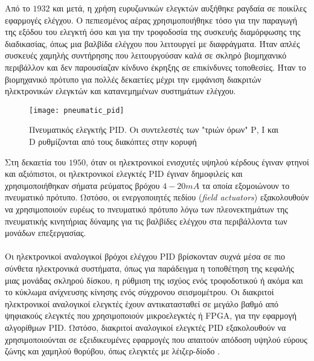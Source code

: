 Από το $1932$ και μετά, η χρήση ευρυζωνικών ελεγκτών αυξήθηκε ραγδαία σε ποικίλες εφαρμογές ελέγχου. Ο πεπιεσμένος αέρας χρησιμοποιήθηκε τόσο για την παραγωγή της εξόδου του ελεγκτή όσο και για την τροφοδοσία της συσκευής διαμόρφωσης της διαδικασίας, όπως μια βαλβίδα ελέγχου που λειτουργεί με διαφράγματα. Ήταν απλές συσκευές χαμηλής συντήρησης που λειτουργούσαν καλά σε σκληρό βιομηχανικό περιβάλλον και δεν παρουσίαζαν κίνδυνο έκρηξης σε επικίνδυνες τοποθεσίες. Ήταν το βιομηχανικό πρότυπο για πολλές δεκαετίες μέχρι την εμφάνιση διακριτών ηλεκτρονικών ελεγκτών και κατανεμημένων συστημάτων ελέγχου.

\begin{figure}[h]
  \centering
  \texttt{[image: pneumatic\_pid]}
  \caption{Πνευματικός ελεγκτής PID. Οι συντελεστές των "τριών όρων" Ρ, Ι και D ρυθμίζονται από τους διακόπτες στην κορυφή}
  \label{fig:pneumatic_pid}
\end{figure}

Στη δεκαετία του $1950$, όταν οι ηλεκτρονικοί ενισχυτές υψηλού κέρδους έγιναν φτηνοί και αξιόπιστοι, οι ηλεκτρονικοί ελεγκτές PID έγιναν δημοφιλείς και χρησιμοποιήθηκαν σήματα ρεύματος βρόχου $4-20 mA$ τα οποία εξομοιώνουν το πνευματικό πρότυπο. Ωστόσο, οι ενεργοποιητές πεδίου (\emph{field actuators}) εξακολουθούν να χρησιμοποιούν ευρέως το πνευματικό πρότυπο λόγω των πλεονεκτημάτων της πνευματικής κινητήριας δύναμης για τις βαλβίδες ελέγχου στα περιβάλλοντα των μονάδων επεξεργασίας.

\paragraph{}Οι ηλεκτρονικοί αναλογικοί βρόχοι ελέγχου PID βρίσκονταν συχνά μέσα σε πιο σύνθετα ηλεκτρονικά συστήματα, όπως για παράδειγμα η τοποθέτηση της κεφαλής μιας μονάδας σκληρού δίσκου, η ρύθμιση της ισχύος ενός τροφοδοτικού ή ακόμα και το κύκλωμα ανίχνευσης κίνησης ενός σύγχρονου σεισμομέτρου. Οι διακριτοί ηλεκτρονικοί αναλογικοί ελεγκτές έχουν αντικατασταθεί σε μεγάλο βαθμό από ψηφιακούς ελεγκτές που χρησιμοποιούν μικροελεγκτές ή FPGA, για την εφαρμογή αλγορίθμων PID. Ωστόσο, διακριτοί αναλογικοί ελεγκτές PID εξακολουθούν να χρησιμοποιούνται σε εξειδικευμένες εφαρμογές που απαιτούν απόδοση υψηλού εύρους ζώνης και χαμηλού θορύβου, όπως ελεγκτές με λέιζερ-δίοδο \cite{origin11}.


